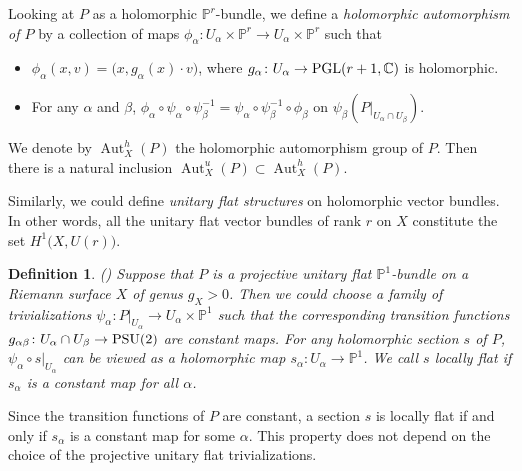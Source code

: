 \documentclass[12pt]{article}
\newtheorem{defn}{Definition}[section]
\begin{document}
Looking at $P$ as a holomorphic $\mathbb{P}^{r}$-bundle, we define a {\it holomorphic automorphism of $P$} by a collection of maps $\phi_{\alpha}\colon U_{\alpha} \times \mathbb{P}^r \rightarrow U_{\alpha} \times \mathbb{P}^r$ such that
\begin{itemize}
  \item $\phi_{\alpha}(x, v)=\big( x, g_{\alpha}(x) \cdot v \big)$, where $g_{\alpha}\colon U_{\alpha} \rightarrow {\rm PGL}(r+1, \mathbb{C})$ is holomorphic.
  \item For any $\alpha$ and $\beta$, $\phi_{\alpha} \circ \psi_{\alpha} \circ \psi_{\beta} ^{-1} = \psi_{\alpha} \circ \psi_{\beta} ^{-1}\circ \phi_{\beta}$ on $\psi_{\beta}(P|_{U_{\alpha} \cap U_{\beta}})$.
\end{itemize}
We denote by $\operatorname{Aut}_{X}^{h}(P)$ the  holomorphic automorphism group of $P$. Then there is a natural inclusion $\operatorname{Aut}_{X}^{u}(P) \subset \operatorname{Aut}_{X}^{h}(P)$.

Similarly, we could define {\it unitary flat structures} on holomorphic vector bundles. In other words, all the unitary flat vector bundles of rank $r$ on $X$ constitute the set $H^1\big(X, U(r)\big)$.

\begin{defn}
\label{def:nonflat} {\rm (\cite{Mand73})}
{\rm Suppose that $P$ is a projective unitary flat $\mathbb{P}^1$-bundle on a Riemann surface $X$ of genus $g_{X} > 0$. Then we could choose a family of trivializations $\psi_{\alpha}\colon P|_{U_{\alpha}} \rightarrow U_{\alpha} \times \mathbb{P}^1$ such that the corresponding transition functions $g_{\alpha\beta}\colon U_{\alpha} \cap U_{\beta} \rightarrow {\rm PSU}(2)$ are  constant maps. For any holomorphic section $s$ of $P$, $\psi_{\alpha} \circ s|_{U_{\alpha}}$ can be viewed as a holomorphic map $s_{\alpha}\colon U_{\alpha} \rightarrow \mathbb{P}^1$. We call $s$ {\it locally flat} if $s_{\alpha}$ is a constant map for all $\alpha$.}
\end{defn}

Since the transition functions of $P$ are constant, a section $s$ is locally flat if and only if $s_{\alpha}$ is a constant map for some $\alpha$. This property does not depend on the choice of the projective unitary flat trivializations.
\end{document}
